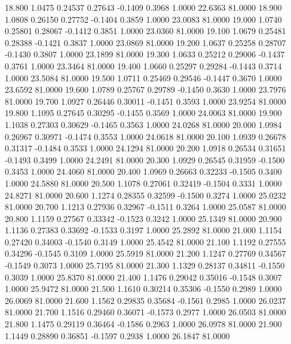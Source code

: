   18.800   1.0475   0.24537   0.27643  -0.1409   0.3968   1.0000  22.6363  81.0000
  18.900   1.0808   0.26150   0.27752  -0.1404   0.3859   1.0000  23.0083  81.0000
  19.000   1.0740   0.25801   0.28067  -0.1412   0.3851   1.0000  23.0360  81.0000
  19.100   1.0679   0.25481   0.28388  -0.1421   0.3837   1.0000  23.0869  81.0000
  19.200   1.0637   0.25258   0.28707  -0.1430   0.3807   1.0000  23.1899  81.0000
  19.300   1.0633   0.25212   0.29006  -0.1437   0.3761   1.0000  23.3464  81.0000
  19.400   1.0660   0.25297   0.29284  -0.1443   0.3714   1.0000  23.5084  81.0000
  19.500   1.0711   0.25469   0.29546  -0.1447   0.3670   1.0000  23.6592  81.0000
  19.600   1.0789   0.25767   0.29789  -0.1450   0.3630   1.0000  23.7976  81.0000
  19.700   1.0927   0.26446   0.30011  -0.1451   0.3593   1.0000  23.9254  81.0000
  19.800   1.1095   0.27645   0.30295  -0.1455   0.3569   1.0000  24.0063  81.0000
  19.900   1.1038   0.27303   0.30629  -0.1465   0.3563   1.0000  24.0268  81.0000
  20.000   1.0984   0.26967   0.30971  -0.1474   0.3553   1.0000  24.0618  81.0000
  20.100   1.0939   0.26678   0.31317  -0.1484   0.3533   1.0000  24.1294  81.0000
  20.200   1.0918   0.26534   0.31651  -0.1493   0.3499   1.0000  24.2491  81.0000
  20.300   1.0929   0.26545   0.31959  -0.1500   0.3453   1.0000  24.4060  81.0000
  20.400   1.0969   0.26663   0.32233  -0.1505   0.3400   1.0000  24.5880  81.0000
  20.500   1.1078   0.27061   0.32419  -0.1504   0.3331   1.0000  24.8271  81.0000
  20.600   1.1274   0.28355   0.32599  -0.1500   0.3274   1.0000  25.0232  81.0000
  20.700   1.1213   0.27936   0.32967  -0.1511   0.3264   1.0000  25.0587  81.0000
  20.800   1.1159   0.27567   0.33342  -0.1523   0.3242   1.0000  25.1349  81.0000
  20.900   1.1136   0.27383   0.33692  -0.1533   0.3197   1.0000  25.2892  81.0000
  21.000   1.1154   0.27420   0.34003  -0.1540   0.3149   1.0000  25.4542  81.0000
  21.100   1.1192   0.27555   0.34296  -0.1545   0.3109   1.0000  25.5919  81.0000
  21.200   1.1247   0.27769   0.34567  -0.1549   0.3073   1.0000  25.7195  81.0000
  21.300   1.1329   0.28137   0.34811  -0.1550   0.3039   1.0000  25.8370  81.0000
  21.400   1.1476   0.29042   0.35016  -0.1548   0.3007   1.0000  25.9472  81.0000
  21.500   1.1610   0.30214   0.35306  -0.1550   0.2989   1.0000  26.0069  81.0000
  21.600   1.1562   0.29835   0.35684  -0.1561   0.2985   1.0000  26.0237  81.0000
  21.700   1.1516   0.29460   0.36071  -0.1573   0.2977   1.0000  26.0503  81.0000
  21.800   1.1475   0.29119   0.36464  -0.1586   0.2963   1.0000  26.0978  81.0000
  21.900   1.1449   0.28890   0.36851  -0.1597   0.2938   1.0000  26.1847  81.0000

